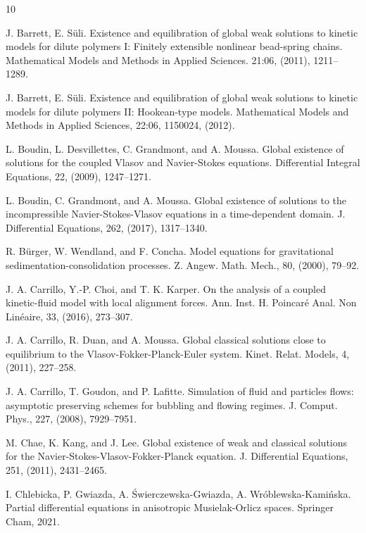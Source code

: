 \documentclass[10pt,reqno]{amsart}
\numberwithin{equation}{section}
\begin{document}
\begin{thebibliography}{10}

J. Barrett, E. S\"uli.
Existence and equilibration of global weak solutions to kinetic models for dilute polymers I: Finitely extensible nonlinear bead-spring chains. Mathematical Models and Methods in Applied Sciences. 21:06, (2011), 1211--1289.

J. Barrett, E. S\"uli.
Existence and equilibration of global weak solutions to kinetic models for dilute polymers II: Hookean-type models.
Mathematical Models and Methods in Applied Sciences, 22:06, 1150024, (2012).


 L. Boudin, L. Desvillettes, C. Grandmont, and A. Moussa. Global existence of solutions for the coupled Vlasov and Navier-Stokes equations. Differential Integral Equations, 22, (2009), 1247--1271.


 L. Boudin, C. Grandmont, and A. Moussa. Global existence of solutions to the incompressible Navier-Stokes-Vlasov equations in a time-dependent domain. J. Differential Equations, 262, (2017), 1317--1340.


 R. B\"urger, W. Wendland, and F. Concha. Model equations for gravitational sedimentation-consolidation processes. Z. Angew. Math. Mech., 80, (2000), 79--92.


 J. A. Carrillo, Y.-P. Choi, and T. K. Karper. On the analysis of a coupled kinetic-fluid model with local alignment forces. Ann. Inst. H. Poincar\'e Anal. Non Lin\'eaire, 33, (2016), 273--307. 

 J. A. Carrillo, R. Duan, and A. Moussa. Global classical solutions close to equilibrium to the Vlasov-Fokker-Planck-Euler system. Kinet. Relat. Models, 4, (2011), 227--258.

 J. A. Carrillo, T. Goudon, and P. Lafitte. Simulation of fluid and particles flows: asymptotic preserving schemes for bubbling and flowing regimes. J. Comput. Phys., 227, (2008), 7929--7951.

 M. Chae, K. Kang, and J. Lee. Global existence of weak and classical solutions for the Navier-Stokes-Vlasov-Fokker-Planck equation. J. Differential Equations, 251, (2011), 2431--2465.

 I. Chlebicka, P. Gwiazda, A. \'Swierczewska-Gwiazda, A. Wr\'oblewska-Kami\'nska.
Partial differential equations in anisotropic Musielak-Orlicz spaces. Springer Cham, 2021.


\end{thebibliography}
\end{document}
